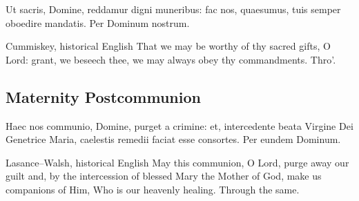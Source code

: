 \begin{latinproper}
Ut sacris, Domine, reddamur digni muneribus: fac nos, quaesumus, tuis semper oboedire mandatis. Per Dominum nostrum.
\end{latinproper}

\begin{englishwitness}{Cummiskey, historical English}
That we may be worthy of thy sacred gifts, O Lord: grant, we beseech thee, we may always obey thy commandments. Thro'.
\end{englishwitness}

\subsection{Maternity Postcommunion}\label{proper-maternity-postcommunion}


\begin{latinproper}
Haec nos communio, Domine, purget a crimine: et, intercedente beata Virgine Dei Genetrice Maria, caelestis remedii faciat esse consortes. Per eundem Dominum.
\end{latinproper}

\begin{englishwitness}{Lasance--Walsh, historical English}
May this communion, O Lord, purge away our guilt and, by the intercession of blessed Mary the Mother of God, make us companions of Him, Who is our heavenly healing. Through the same.
\end{englishwitness}

